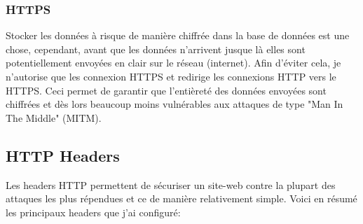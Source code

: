 \subsubsection{HTTPS}
Stocker les données à risque de manière chiffrée dans la base de données est une chose, cependant, avant que les données n'arrivent jusque là elles sont potentiellement envoyées en clair sur le réseau (internet). Afin d'éviter cela, je n'autorise que les connexion HTTPS et redirige les connexions HTTP vers le HTTPS. Ceci permet de garantir que l'entièreté des données envoyées sont chiffrées et dès lors beaucoup moins vulnérables aux attaques de type "Man In The Middle" (MITM).

\newpage

\subsection{HTTP Headers}

Les headers HTTP permettent de sécuriser un site-web contre la plupart des attaques les plus répendues et ce de manière relativement simple. Voici en résumé les principaux headers que j'ai configuré:

